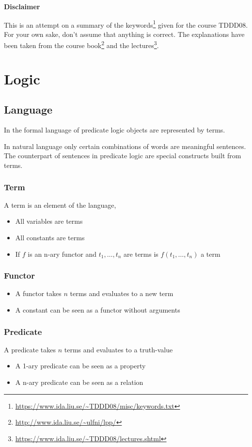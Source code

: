 \documentclass{article}
\begin{document}
\textbf{Disclaimer}

This is an attempt on a summary of the keywords\footnote{\url{https://www.ida.liu.se/~TDDD08/misc/keywords.txt}} given for the course TDDD08. For your own sake, don't assume that anything is correct. The explanations have been taken from the course book\footnote{\url{http://www.ida.liu.se/~ulfni/lpp/}} and the lectures\footnote{\url{https://www.ida.liu.se/~TDDD08/lectures.shtml}}.

\tableofcontents

\section{Logic}

\subsection{Language}
In the formal language of predicate logic objects are represented by terms.

In natural language only certain combinations of words are meaningful sentences.
The counterpart of sentences in predicate logic are special constructs built from terms.
\subsubsection{Term}
A term is an element of the language,
\begin{itemize}
    \item All variables are terms
    \item All constants are terms
    \item If $f$ is an n-ary functor and $t_1,\ldots,t_n$ are terms is $f(t_1,\ldots,t_n)$ a term
\end{itemize}

\subsubsection{Functor}
\begin{itemize}
    \item A functor takes $n$ terms and evaluates to a new term
    \item A constant can be seen as a functor without arguments
\end{itemize}

\subsubsection{Predicate}
A predicate takes $n$ terms and evaluates to a truth-value
\begin{itemize}
    \item A 1-ary predicate can be seen as a property
    \item A n-ary predicate can be seen as a relation
\end{itemize}
\end{document}
